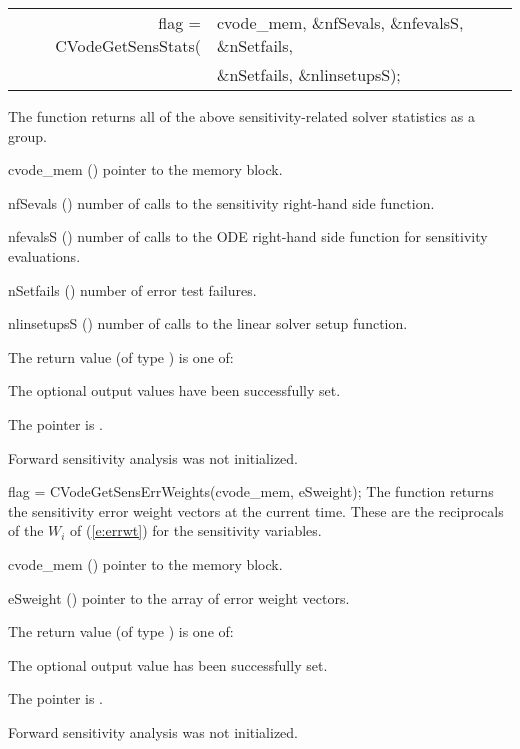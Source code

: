 {
  \begin{tabular}[t]{@{}r@{}l@{}}
    flag = CVodeGetSensStats(&cvode\_mem, \&nfSevals, \&nfevalsS, \&nSetfails,\\
                             &\&nSetfails, \&nlinsetupsS);
  \end{tabular}
}
{
  The function  returns all of the above sensitivity-related solver
  statistics as a group.
}
{
  \begin{args}
  \item[cvode\_mem] ()
    pointer to the {\cvodes} memory block.
  \item[nfSevals] ()
    number of calls to the sensitivity right-hand side function.
  \item[nfevalsS] ()
    number of calls to the ODE right-hand side function for
    sensitivity evaluations.
  \item[nSetfails] ()
    number of error test failures.
  \item[nlinsetupsS] ()
    number of calls to the linear solver setup function.
  \end{args}
}
{
  The return value  (of type ) is one of:
  \begin{args}
  \item[\Id{CV\_SUCCESS}] 
    The optional output values have been successfully set.
  \item[\Id{CV\_MEM\_NULL}]
    The  pointer is .
  \item[\Id{CV\_NO\_SENS}]
    Forward sensitivity analysis was not initialized.
  \end{args}
}
{}
{
  flag = CVodeGetSensErrWeights(cvode\_mem, eSweight);
}
{
  The function  returns the sensitivity error weight
  vectors at the current time. These are the reciprocals of the $W_i$ of
  (\ref{e:errwt}) for the sensitivity variables.
}
{
  \begin{args}
  \item[cvode\_mem] ()
    pointer to the {\cvodes} memory block.
  \item[eSweight] ()
    pointer to the array of error weight vectors.
  \end{args}
}
{
  The return value  (of type ) is one of:
  \begin{args}
  \item[\Id{CV\_SUCCESS}] 
    The optional output value has been successfully set.
  \item[\Id{CV\_MEM\_NULL}]
    The  pointer is .
  \item[\Id{CV\_NO\_SENS}]
    Forward sensitivity analysis was not initialized.
  \end{args}
}
